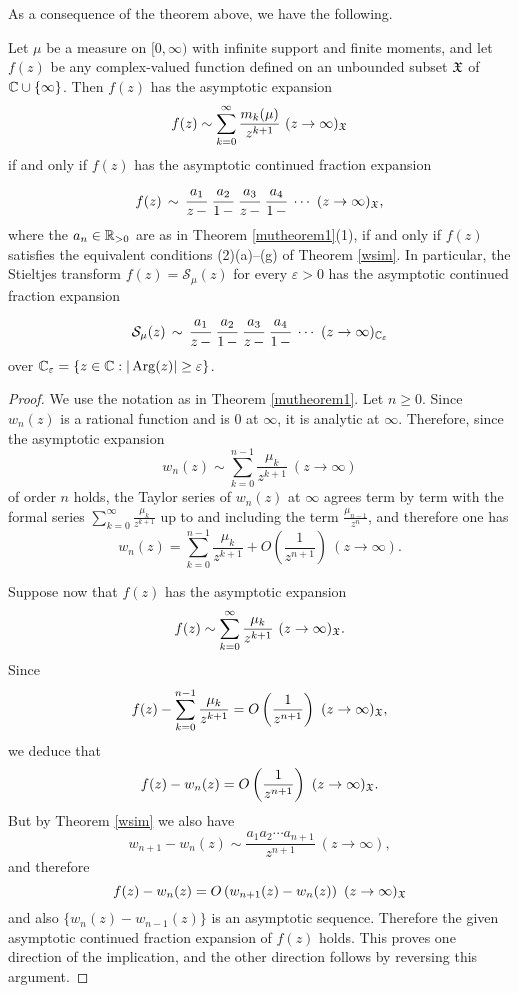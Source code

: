 \documentclass[12pt]{article}
\begin{document}
As a consequence of the theorem above, we have the following.

\begin{theorem}\label{mutheorem}
Let $\mu$ be a measure on $[0, \infty)$ with infinite support and finite moments, and let $f(z)$ be any complex-valued function defined on an unbounded subset ${\mathfrak X}$ of  ${\mathbb C} \cup \{\infty\}$.   Then $f(z)$ has the asymptotic expansion
$$f(z) \sim \sum_{k = 0}^\infty \frac{m_k(\mu)}{z^{k+1}} \ (z \to \infty)_{\mathfrak X}$$
if and only if $f(z)$ has the  asymptotic continued fraction expansion
$$f(z) \, \sim \, \cfrac{a_1} {z \, -} \ \cfrac{a_2} {1 \, -}  \ \cfrac{a_3} {z \, -} \ \cfrac{a_4} {1 \, -} \  \cdots \ (z \to \infty)_\XX,$$
where the $a_n \in {\mathbb R}_{> 0}$ are as in Theorem \ref{mutheorem1}(1), if and only if $f(z)$ satisfies the equivalent conditions (2)(a)--(g) of Theorem \ref{wsim}. 
In particular, the Stieltjes transform $f(z) = {\mathcal S}_\mu(z)$   for every $\varepsilon > 0$  has the asymptotic continued fraction expansion
$${\mathcal S}_\mu(z) \, \sim \,  \cfrac{a_1} {z \, -} \ \cfrac{a_2} {1 \, -}  \ \cfrac{a_3} {z \, -} \ \cfrac{a_4} {1 \, -} \  \cdots  \ (z \to \infty)_{{\mathbb C}_\varepsilon}$$
over  ${\mathbb C}_{\varepsilon} = \{z \in {\mathbb C} : |\operatorname{Arg}(z)| \geq \varepsilon\}$.
\end{theorem}

\begin{proof}
We use the notation as in Theorem \ref{mutheorem1}.  Let $n \geq 0$.  Since $w_n(z)$ is a rational function and is $0$ at $\infty$, it is analytic at $\infty$.  Therefore, since the asymptotic expansion
$$w_n(z) \sim  \sum_{k = 0}^{n-1} \frac{\mu_k}{z^{k+1}}  \ (z \to \infty)$$ 
of order $n$ holds, the Taylor series of $w_n(z)$ at $\infty$  agrees term by term  with the formal series  $\sum_{k = 0}^\infty \frac{\mu_k}{z^{k+1}}$ up to and including the term $\frac{\mu_{n-1}}{z^n}$, and therefore one has
$$w_n(z) = \sum_{k = 0}^{n-1} \frac{\mu_k}{z^{k+1}} + O\left( \frac{1}{z^{n+1}}\right) \ (z \to \infty).$$
 
Suppose now that $f(z)$ has the asymptotic expansion
$$f(z) \sim \sum_{k = 0}^\infty \frac{\mu_k}{z^{k+1}} \ (z \to \infty)_{\mathfrak X}.$$
Since
$$f(z) - \sum_{k = 0}^{n-1} \frac{\mu_k}{z^{k+1}} = O\left( \frac{1}{z^{n+1}}\right) \ (z \to \infty)_{\mathfrak X},$$
we deduce that
$$f(z) - w_n(z) = O\left( \frac{1}{z^{n+1}}\right) \ (z \to \infty)_{\mathfrak X}.$$
But by Theorem \ref{wsim} we also have
$$w_{n+1}-w_n(z) \sim \frac{a_1 a_2 \cdots a_{n+1}}{z^{n+1}} \ (z \to \infty),$$
 and therefore $$f(z) - w_n(z) = O\left( w_{n+1}(z)-w_n(z) \right)  \ (z \to \infty)_{\mathfrak X}$$ and also $\{w_{n}(z)-w_{n-1}(z)\}$ is an asymptotic sequence.  Therefore the given asymptotic continued fraction expansion of $f(z)$ holds.  This proves one direction of the implication, and the other direction follows by reversing this argument.
\end{proof}
\end{document}
